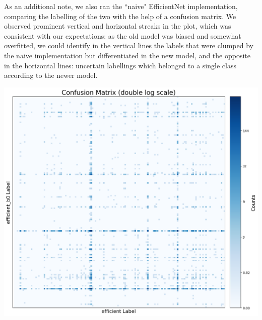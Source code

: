 \documentclass[11pt]{article}
\begin{document}
\begin{minipage}{0.65\linewidth}
  As an additional note, we also ran the ``naive" EfficientNet implementation, comparing the labelling of the two with the help of a confusion matrix. We observed prominent vertical and horizontal streaks in the plot, which was consistent with our expectations: as the old model was biased and somewhat overfitted, we could identify in the vertical lines the labels that were clumped by the naive implementation but differentiated in the new model, and the opposite in the horizontal lines: uncertain labellings which belonged to a single class according to the newer model.
\end{minipage}
\hfill
\begin{minipage}{0.30\linewidth}
  \includegraphics[width=\linewidth]{img/confusion_matrix_efficient_models.png}
\end{minipage}

\vspace{1em}
\end{document}
